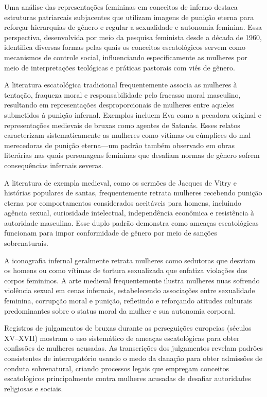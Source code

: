 Uma análise das representações femininas em conceitos de inferno destaca estruturas patriarcais subjacentes que utilizam imagens de punição eterna para reforçar hierarquias de gênero e regular a sexualidade e autonomia feminina. Essa perspectiva, desenvolvida por meio da pesquisa feminista desde a década de 1960, identifica diversas formas pelas quais os conceitos escatológicos servem como mecanismos de controle social, influenciando especificamente as mulheres por meio de interpretações teológicas e práticas pastorais com viés de gênero.

A literatura escatológica tradicional frequentemente associa as mulheres à tentação, fraqueza moral e responsabilidade pelo fracasso moral masculino, resultando em representações desproporcionais de mulheres entre aqueles submetidos à punição infernal. Exemplos incluem Eva como a pecadora original e representações medievais de bruxas como agentes de Satanás. Esses relatos caracterizam sistematicamente as mulheres como vítimas ou cúmplices do mal merecedoras de punição eterna---um padrão também observado em obras literárias nas quais personagens femininas que desafiam normas de gênero sofrem consequências infernais severas.

A literatura de exempla medieval, como os sermões de Jacques de Vitry e histórias populares de santas, frequentemente retrata mulheres recebendo punição eterna por comportamentos considerados aceitáveis para homens, incluindo agência sexual, curiosidade intelectual, independência econômica e resistência à autoridade masculina. Esse duplo padrão demonstra como ameaças escatológicas funcionam para impor conformidade de gênero por meio de sanções sobrenaturais.

A iconografia infernal geralmente retrata mulheres como sedutoras que desviam os homens ou como vítimas de tortura sexualizada que enfatiza violações dos corpos femininos. A arte medieval frequentemente ilustra mulheres nuas sofrendo violência sexual em cenas infernais, estabelecendo associações entre sexualidade feminina, corrupção moral e punição, refletindo e reforçando atitudes culturais predominantes sobre o status moral da mulher e sua autonomia corporal.

Registros de julgamentos de bruxas durante as perseguições europeias (séculos XV--XVII) mostram o uso sistemático de ameaças escatológicas para obter confissões de mulheres acusadas. As transcrições dos julgamentos revelam padrões consistentes de interrogatório usando o medo da danação para obter admissões de conduta sobrenatural, criando processos legais que empregam conceitos escatológicos principalmente contra mulheres acusadas de desafiar autoridades religiosas e sociais.

